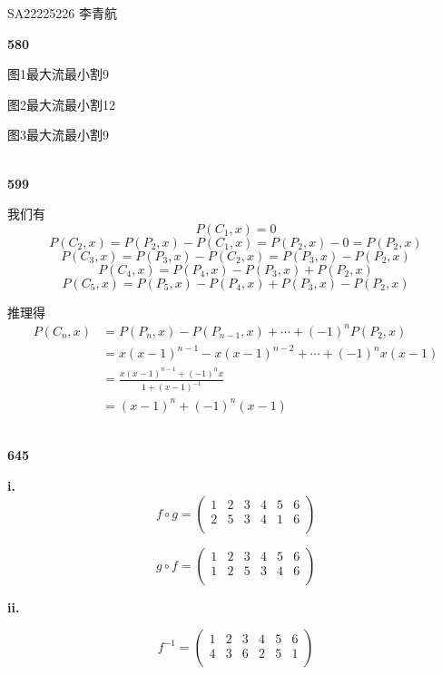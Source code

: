 \documentclass[UTF8]{ctexart}
\begin{document}
    SA22225226 李青航

    \noindent\textbf{580}

    图1最大流最小割9

    图2最大流最小割12

    图3最大流最小割9

    ~\\
    \noindent\textbf{599}

    我们有
$$
P(C_1,x)=0
$$
$$P(C_2,x)=P(P_2,x)-P(C_1,x)=P(P_2,x)-0=P(P_2,x)$$
$$P(C_3,x)=P(P_3,x)-P(C_2,x)=P(P_3,x)-P(P_2,x)
$$
$$P(C_4,x)=P(P_4,x)-P(P_3,x)+P(P_2,x)$$
$$P(C_5,x)=P(P_5,x)-P(P_4,x)+P(P_3,x)-P(P_2,x)
$$

推理得
\begin{equation*}
    \begin{aligned}
        P(C_n,x)
        &=P(P_n,x)-P(P_{n-1},x)+\cdots+(-1)^nP(P_2,x)\\
        &=x(x-1)^{n-1}-x(x-1)^{n-2}+\cdots+(-1)^nx(x-1)\\
        &=\frac{x(x-1)^{n-1}+(-1)^nx}{1+(x-1)^{-1}}\\
        &=(x-1)^n+(-1)^n(x-1)
    \end{aligned}
\end{equation*}

    ~\\
    \noindent\textbf{645}

    \textbf{i.}
    \begin{equation*}
        f\circ g=
        \begin{pmatrix}
            1 & 2 & 3 & 4 & 5 & 6  \\
            2 & 5 & 3 & 4 & 1 & 6  \\
        \end{pmatrix}
    \end{equation*}

    \begin{equation*}
        g\circ f=
        \begin{pmatrix}
            1 & 2 & 3 & 4 & 5 & 6  \\
            1 & 2 & 5 & 3 & 4 & 6  \\
        \end{pmatrix}
    \end{equation*}

    \textbf{ii.}

    \begin{equation*}
        f^{-1}=
        \begin{pmatrix}
            1 & 2 & 3 & 4 & 5 & 6  \\
            4 & 3 & 6 & 2 & 5 & 1  \\
        \end{pmatrix}
    \end{equation*}
\end{document}
